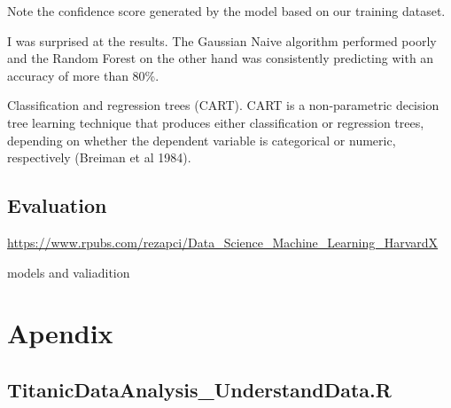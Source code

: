 \documentclass[
]{book}
\begin{document}
Note the confidence score generated by the model based on our training dataset.

I was surprised at the results. The Gaussian Naive algorithm performed poorly and the Random Forest on the other hand was consistently predicting with an accuracy of more than 80\%.

Classification and regression trees (CART). CART is a non-parametric decision tree learning technique that produces either classification or regression trees, depending on whether the dependent variable is categorical or numeric, respectively (Breiman et al 1984).

\hypertarget{evaluation}{%
\section{Evaluation}\label{evaluation}}

\url{https://www.rpubs.com/rezapci/Data_Science_Machine_Learning_HarvardX}

models and valiadition

\hypertarget{apendix}{%
\chapter*{Apendix}\label{apendix}}


\hypertarget{UnderstandDatacode}{%
\section{TitanicDataAnalysis\_UnderstandData.R}\label{UnderstandDatacode}}
\end{document}
